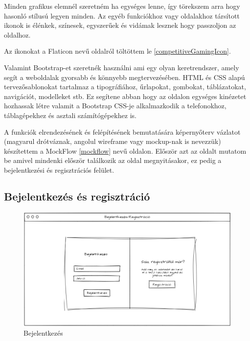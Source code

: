 Minden grafikus elemnél szeretném ha egységes lenne, így törekszem arra hogy hasonló stílusú legyen minden. Az egyéb funkciókhoz vagy oldalakhoz társított ikonok is élénkek, színesek, egyszerűek és vidámak lesznek hogy passzoljon az oldalhoz.

Az ikonokat a Flaticon nevű oldalról töltöttem le \ref{competitiveGamingIcon}.

Valamint Bootstrap-et szeretnék használni ami egy olyan keretrendszer, amely segít a weboldalak gyorsabb és könnyebb megtervezésében. HTML és CSS alapú tervezősablonokat tartalmaz a tipográfiához, űrlapokat, gombokat, táblázatokat, navigációt, modelleket stb. Ez segítene abban hogy az oldalon egységes kinézetet hozhassak létre valamit a Bootstrap CSS-je alkalmazkodik a telefonokhoz, táblagépekhez és asztali számítógépekhez is.


A funkciók elrendezésének és felépítésének bemutatására képernyőterv vázlatot (magyarul drótváznak, angolul wireframe vagy mockup-nak is nevezzük) készítettem a MockFlow \ref{mockflow} nevű oldalon.
Először azt az oldalt mutatom be amivel mindenki először találkozik az oldal megnyitásakor, ez pedig a bejelentkezési és regisztrációs felület.

\subsection{Bejelentkezés és regisztráció}

\begin{figure}[H]
    \centering
    \includegraphics[width=\linewidth]{images/login_wireframe.png}
    \caption{Bejelentkezés}
    \label{fig:login_wireframe}
\end{figure}

